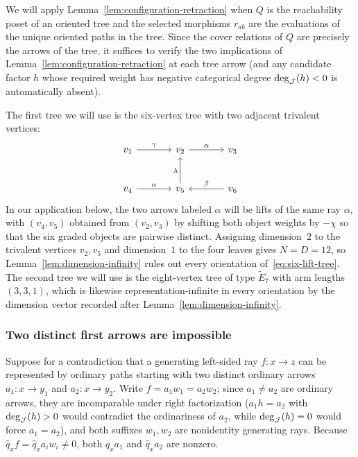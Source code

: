 We will apply Lemma~\ref{lem:configuration-retraction} when $Q$ is the reachability poset of an oriented tree and the selected morphisms $r_{ab}$ are the evaluations of the unique oriented paths in the tree. Since the cover relations of $Q$ are precisely the arrows of the tree, it suffices to verify the two implications of Lemma~\ref{lem:configuration-retraction} at each tree arrow (and any candidate factor $h$ whose required weight has negative categorical degree $\deg_\mathcal J(h)<0$ is automatically absent).

The first tree we will use is the six-vertex tree with two adjacent trivalent vertices:
\begin{equation}
  \sixlifttree
  \label{eq:six-lift-tree}
\end{equation}
In our application below, the two arrows labeled $\alpha$ will be lifts of the same ray $\alpha$, with $(v_4,v_5)$ obtained from $(v_2,v_3)$ by shifting both object weights by $-\chi$ so that the six graded objects are pairwise distinct. Assigning dimension~$2$ to the trivalent vertices $v_2,v_5$ and dimension~$1$ to the four leaves gives $N=D=12$, so Lemma~\ref{lem:dimension-infinity} rules out every orientation of~\eqref{eq:six-lift-tree}. The second tree we will use is the eight-vertex tree of type $\widetilde E_7$ with arm lengths $(3,3,1)$, which is likewise representation-infinite in every orientation by the dimension vector recorded after Lemma~\ref{lem:dimension-infinity}.

\subsubsection{Two distinct first arrows are impossible}

Suppose for a contradiction that a generating left-sided ray $f\colon x\to z$ can be represented by ordinary paths starting with two distinct ordinary arrows $a_1\colon x\to y_1$ and $a_2\colon x\to y_2$. Write $f=a_1w_1=a_2w_2$; since $a_1\ne a_2$ are ordinary arrows, they are incomparable under right factorization ($a_1h=a_2$ with $\deg_\mathcal J(h)>0$ would contradict the ordinariness of $a_2$, while $\deg_\mathcal J(h)=0$ would force $a_1=a_2$), and both suffixes $w_1,w_2$ are nonidentity generating rays. Because $\widehat q_xf=\widehat q_xa_iw_i\ne0$, both $\widehat q_xa_1$ and $\widehat q_xa_2$ are nonzero.

